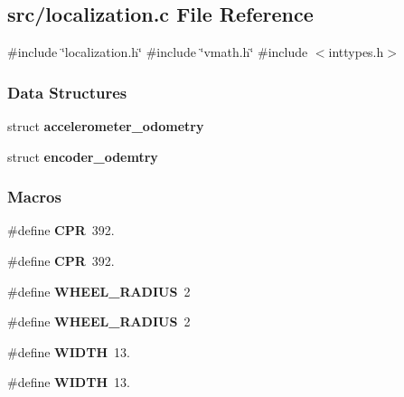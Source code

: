 \subsection{src/localization.c File Reference}
\label{a00119}
{\ttfamily \#include \char`\"{}localization.\+h\char`\"{}}\newline
{\ttfamily \#include \char`\"{}vmath.\+h\char`\"{}}\newline
{\ttfamily \#include $<$inttypes.\+h$>$}\newline
\subsubsection*{Data Structures}
\begin{DoxyCompactItemize}
\item 
struct \textbf{ accelerometer\+\_\+odometry}
\item 
struct \textbf{ encoder\+\_\+odemtry}
\end{DoxyCompactItemize}
\subsubsection*{Macros}
\begin{DoxyCompactItemize}
\item 
\#define \textbf{ C\+PR}~392.
\item 
\#define \textbf{ C\+PR}~392.
\item 
\#define \textbf{ W\+H\+E\+E\+L\+\_\+\+R\+A\+D\+I\+US}~2
\item 
\#define \textbf{ W\+H\+E\+E\+L\+\_\+\+R\+A\+D\+I\+US}~2
\item 
\#define \textbf{ W\+I\+D\+TH}~13.
\item 
\#define \textbf{ W\+I\+D\+TH}~13.
\end{DoxyCompactItemize}
